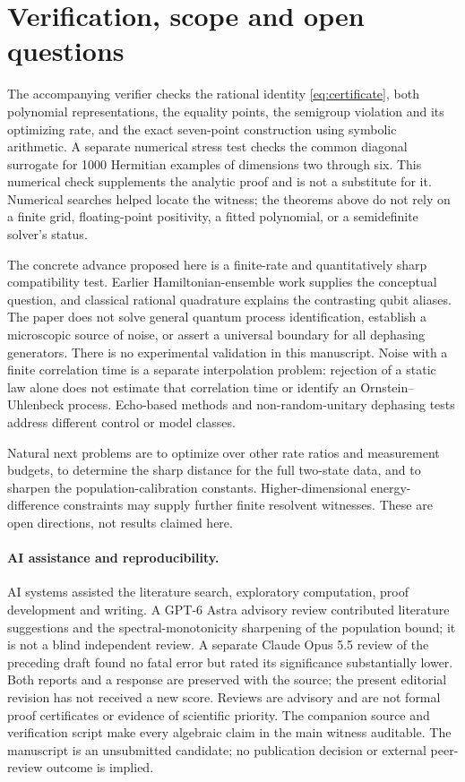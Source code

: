 \documentclass[11pt,a4paper]{article}
\begin{document}
\section{Verification, scope and open questions}
The accompanying verifier checks the rational identity
\eqref{eq:certificate}, both polynomial representations, the
equality points, the semigroup violation and its optimizing rate,
and the exact seven-point construction using symbolic arithmetic.
A separate numerical stress test checks the common diagonal surrogate
for 1000 Hermitian examples of dimensions two through six. This
numerical check supplements the analytic proof and is not a substitute
for it.
Numerical searches helped locate the witness; the theorems above
do not rely on a finite grid, floating-point positivity, a fitted
polynomial, or a semidefinite solver's status.

The concrete advance proposed here is a finite-rate and quantitatively
sharp compatibility test. Earlier Hamiltonian-ensemble work supplies
the conceptual question, and classical rational quadrature explains
the contrasting qubit aliases. The paper does not solve general
quantum process identification, establish a microscopic source of
noise, or assert a universal boundary for all dephasing generators.
There is no experimental validation in this manuscript. Noise with a
finite correlation time is a separate interpolation problem: rejection
of a static law alone does not estimate that correlation time or identify
an Ornstein--Uhlenbeck process. Echo-based methods and non-random-unitary
dephasing tests \cite{hahn,helm} address different control or model classes.

Natural next problems are to optimize over other rate ratios and
measurement budgets, to determine the sharp distance for the full
two-state data, and to sharpen the population-calibration constants. Higher-dimensional energy-difference constraints may supply
further finite resolvent witnesses. These are open directions, not
results claimed here.

\paragraph{AI assistance and reproducibility.}
AI systems assisted the literature search, exploratory computation,
proof development and writing. A GPT-6 Astra advisory review contributed
literature suggestions and the spectral-monotonicity sharpening of the
population bound; it is not a blind independent review. A separate
Claude Opus 5.5 review of the preceding draft found no fatal error but
rated its significance substantially lower. Both reports and a response
are preserved with the source; the present editorial revision has not
received a new score. Reviews are advisory and are not
formal proof certificates or evidence of scientific priority.
The companion source and verification script make every algebraic
claim in the main witness auditable. The manuscript is an unsubmitted
candidate; no publication decision or external peer-review outcome
is implied.
\end{document}
